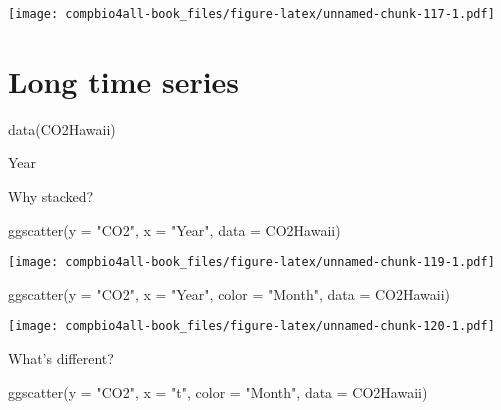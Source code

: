 \documentclass[
]{book}
\newenvironment{Shaded}{\begin{snugshade}}{\end{snugshade}}
\newcommand{\AttributeTok}[1]{\textcolor[rgb]{0.77,0.63,0.00}{#1}}
\newcommand{\FunctionTok}[1]{\textcolor[rgb]{0.00,0.00,0.00}{#1}}
\newcommand{\NormalTok}[1]{#1}
\newcommand{\StringTok}[1]{\textcolor[rgb]{0.31,0.60,0.02}{#1}}
\begin{document}
\texttt{[image: compbio4all-book\_files/figure-latex/unnamed-chunk-117-1.pdf]}

\hypertarget{long-time-series}{%
\section{Long time series}\label{long-time-series}}

\begin{Shaded}
\begin{Highlighting}[]
\FunctionTok{data}\NormalTok{(CO2Hawaii)}
\end{Highlighting}
\end{Shaded}

Year

Why stacked?

\begin{Shaded}
\begin{Highlighting}[]
\FunctionTok{ggscatter}\NormalTok{(}\AttributeTok{y =} \StringTok{"CO2"}\NormalTok{,}
       \AttributeTok{x =} \StringTok{"Year"}\NormalTok{,}
       \AttributeTok{data =}\NormalTok{ CO2Hawaii)}
\end{Highlighting}
\end{Shaded}

\texttt{[image: compbio4all-book\_files/figure-latex/unnamed-chunk-119-1.pdf]}

\begin{Shaded}
\begin{Highlighting}[]
\FunctionTok{ggscatter}\NormalTok{(}\AttributeTok{y =} \StringTok{"CO2"}\NormalTok{,}
       \AttributeTok{x =} \StringTok{"Year"}\NormalTok{,}
       \AttributeTok{color =} \StringTok{"Month"}\NormalTok{,}
       \AttributeTok{data =}\NormalTok{ CO2Hawaii)}
\end{Highlighting}
\end{Shaded}

\texttt{[image: compbio4all-book\_files/figure-latex/unnamed-chunk-120-1.pdf]}

What's different?

\begin{Shaded}
\begin{Highlighting}[]
\FunctionTok{ggscatter}\NormalTok{(}\AttributeTok{y =} \StringTok{"CO2"}\NormalTok{,}
       \AttributeTok{x =} \StringTok{"t"}\NormalTok{,}
       \AttributeTok{color =} \StringTok{"Month"}\NormalTok{,}
       \AttributeTok{data =}\NormalTok{ CO2Hawaii)}
\end{Highlighting}
\end{Shaded}
\end{document}

